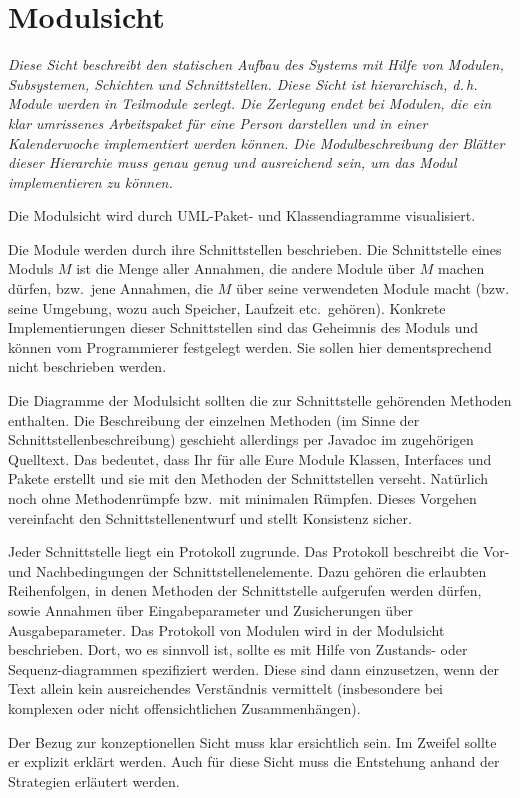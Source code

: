 \documentclass[fontsize=12pt,paper=a4,twoside]{scrartcl}
\begin{document}
\section{Modulsicht} \label{sec:modulsicht}

{\itshape Diese Sicht beschreibt den statischen Aufbau des Systems mit Hilfe von
Modulen, Subsystemen, Schichten und Schnittstellen. Diese Sicht ist 
hierarchisch, d.\,h. Module werden in Teilmodule zerlegt. Die Zerlegung endet 
bei Modulen, die ein klar umrissenes Arbeitspaket für eine Person darstellen und
in einer Kalenderwoche implementiert werden können. Die Modulbeschreibung der 
Blätter dieser Hierarchie muss genau genug und ausreichend sein, um das Modul 
implementieren zu können.

Die Modulsicht wird durch {UML}-Paket- und Klassendiagramme visualisiert.

Die Module werden durch ihre Schnittstellen beschrieben.
Die Schnittstelle eines Moduls $M$ ist die Menge aller Annahmen, die andere 
Module über $M$ machen dürfen, bzw.\ jene Annahmen, die $M$ über seine 
verwendeten Module macht (bzw. seine Umgebung, wozu auch Speicher, Laufzeit 
etc.\ gehören).
Konkrete Implementierungen dieser Schnittstellen sind das Geheimnis des Moduls
und können vom Programmierer festgelegt werden. Sie sollen hier dementsprechend 
nicht beschrieben werden. 

Die Diagramme der Modulsicht sollten die zur Schnittstelle gehörenden Methoden
enthalten. Die Beschreibung der einzelnen Methoden (im Sinne der 
Schnittstellenbeschreibung) geschieht allerdings per Javadoc im zugehörigen 
Quelltext. Das bedeutet, dass Ihr für alle Eure Module Klassen, Interfaces und 
Pakete erstellt und sie mit den Methoden der Schnittstellen verseht. Natürlich 
noch ohne Methodenrümpfe bzw.\ mit minimalen Rümpfen. Dieses Vorgehen 
vereinfacht den Schnittstellenentwurf und stellt Konsistenz sicher.

Jeder Schnittstelle liegt ein Protokoll zugrunde. Das Protokoll beschreibt die 
Vor- und Nachbedingungen der Schnittstellenelemente. Dazu gehören die erlaubten
Reihenfolgen, in denen Methoden der Schnittstelle aufgerufen werden dürfen, 
sowie Annahmen über Eingabeparameter und Zusicherungen über Ausgabeparameter. 
Das Protokoll von Modulen wird in der Modulsicht beschrieben.
Dort, wo es sinnvoll ist, sollte es mit Hilfe von Zustands- oder 
Sequenz-diagrammen spezifiziert werden. Diese sind dann einzusetzen, wenn der
Text allein kein ausreichendes Verständnis vermittelt (insbesondere bei 
komplexen oder nicht offensichtlichen Zusammenhängen).

Der Bezug zur konzeptionellen Sicht muss klar ersichtlich sein. Im Zweifel 
sollte er explizit erklärt werden. Auch für diese Sicht muss die Entstehung 
anhand der Strategien erläutert werden.}
\end{document}
